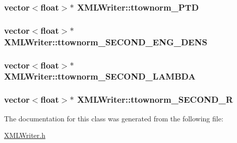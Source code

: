 \subsubsection[{\texorpdfstring{ttownorm\+\_\+\+P\+TD}{ttownorm_PTD}}]{\setlength{\rightskip}{0pt plus 5cm}vector$<$float$>$$\ast$ X\+M\+L\+Writer\+::ttownorm\+\_\+\+P\+TD}\hypertarget{classXMLWriter_a19c4fccdbdb8ed24fe266658bd4385af}{}\label{classXMLWriter_a19c4fccdbdb8ed24fe266658bd4385af}
\subsubsection[{\texorpdfstring{ttownorm\+\_\+\+S\+E\+C\+O\+N\+D\+\_\+\+E\+N\+G\+\_\+\+D\+E\+NS}{ttownorm_SECOND_ENG_DENS}}]{\setlength{\rightskip}{0pt plus 5cm}vector$<$float$>$$\ast$ X\+M\+L\+Writer\+::ttownorm\+\_\+\+S\+E\+C\+O\+N\+D\+\_\+\+E\+N\+G\+\_\+\+D\+E\+NS}\hypertarget{classXMLWriter_ac2396b97dd99d4f9b8da5f98057588c5}{}\label{classXMLWriter_ac2396b97dd99d4f9b8da5f98057588c5}
\subsubsection[{\texorpdfstring{ttownorm\+\_\+\+S\+E\+C\+O\+N\+D\+\_\+\+L\+A\+M\+B\+DA}{ttownorm_SECOND_LAMBDA}}]{\setlength{\rightskip}{0pt plus 5cm}vector$<$float$>$$\ast$ X\+M\+L\+Writer\+::ttownorm\+\_\+\+S\+E\+C\+O\+N\+D\+\_\+\+L\+A\+M\+B\+DA}\hypertarget{classXMLWriter_a8fb1660766bc54ca8643780e5c7ddb75}{}\label{classXMLWriter_a8fb1660766bc54ca8643780e5c7ddb75}
\subsubsection[{\texorpdfstring{ttownorm\+\_\+\+S\+E\+C\+O\+N\+D\+\_\+R}{ttownorm_SECOND_R}}]{\setlength{\rightskip}{0pt plus 5cm}vector$<$float$>$$\ast$ X\+M\+L\+Writer\+::ttownorm\+\_\+\+S\+E\+C\+O\+N\+D\+\_\+R}\hypertarget{classXMLWriter_a1b7dc816ecaebd14e8ec5f0bd7c085d3}{}\label{classXMLWriter_a1b7dc816ecaebd14e8ec5f0bd7c085d3}


The documentation for this class was generated from the following file\+:\begin{DoxyCompactItemize}
\item 
\hyperlink{XMLWriter_8h}{X\+M\+L\+Writer.\+h}\end{DoxyCompactItemize}
